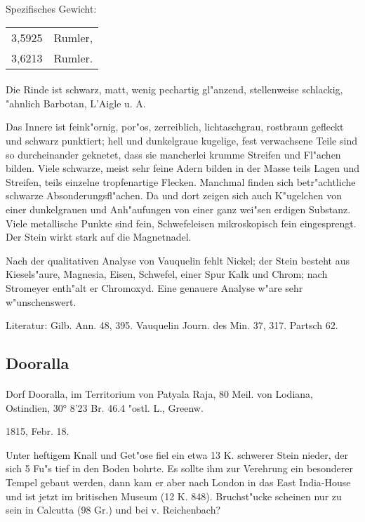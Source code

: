 \documentclass[a4paper, 11pt, oneside]{article}
\begin{document}
Spezifisches Gewicht:
\begin{table}[!ht]
    \centering
    \begin{tabular}{l l}
        3,5925 & Rumler,\\
        3,6213 & Rumler.
    \end{tabular}
\end{table}
\paragraph{}
Die Rinde ist schwarz, matt, wenig pechartig gl"anzend, stellenweise schlackig, "ahnlich Barbotan, L'Aigle u. A.

Das Innere ist feink"ornig, por"os, zerreiblich, lichtaschgrau, rostbraun gefleckt und schwarz punktiert; hell und dunkelgraue kugelige, fest verwachsene Teile sind so durcheinander geknetet, dass sie mancherlei krumme Streifen und Fl"achen bilden. Viele schwarze, meist sehr feine Adern bilden in der Masse teils Lagen und Streifen, teils einzelne tropfenartige Flecken. Manchmal finden sich betr"achtliche schwarze Absonderungsfl"achen. Da und dort zeigen sich auch K"ugelchen von einer dunkelgrauen und Anh"aufungen von einer ganz wei"sen erdigen Substanz. Viele metallische Punkte sind fein, Schwefeleisen mikroskopisch fein eingesprengt. Der Stein wirkt stark auf die Magnetnadel.

Nach der qualitativen Analyse von Vauquelin fehlt Nickel; der Stein besteht aus Kiesels"aure, Magnesia, Eisen, Schwefel, einer Spur Kalk und Chrom; nach Stromeyer enth"alt er Chromoxyd. Eine genauere Analyse w"are sehr w"unschenswert.

Literatur: Gilb. Ann. 48, 395. Vauquelin Journ. des Min. 37, 317. Partsch 62.

\subsection{Dooralla}
\normalsize
\paragraph{}
Dorf Dooralla, im Territorium von Patyala Raja, 80 Meil. von Lodiana, Ostindien, 30° 8'23 Br. 46.4 "ostl. L., Greenw.

1815, Febr. 18.

Unter heftigem Knall und Get"ose fiel ein etwa 13 K. schwerer Stein nieder, der sich 5 Fu"s tief in den Boden bohrte. Es sollte ihm zur Verehrung ein besonderer Tempel gebaut werden, dann kam er aber nach London in das East India-House und ist jetzt im britischen Museum (12 K. 848). Bruchst"ucke scheinen nur zu sein in Calcutta (98 Gr.) und bei v. Reichenbach?
\end{document}

